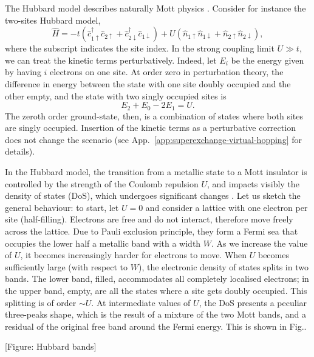 The Hubbard model describes naturally Mott physics \cite{scalapino2012common}. Consider for instance the two-sites Hubbard model,
\begin{equation}\label{eq:hubbard-2-sites}
	\hat H = 
	-t \left(
		\hat c_{1\uparrow}^\dagger \hat c_{2\uparrow} + \hat c_{2\downarrow}^\dagger \hat c_{1\downarrow}
	\right)
	+ U \left(
		\hat n_{1\uparrow} \hat n_{1\downarrow} + \hat n_{2\uparrow} \hat n_{2\downarrow} 
	\right),
\end{equation}
where the subscript indicates the site index. In the strong coupling limit $U \gg t$, we can treat the kinetic terms perturbatively. Indeed, let $E_i$ be the energy given by having $i$ electrons on one site. At order zero in perturbation theory, the difference in energy between the state with one site doubly occupied and the other empty, and the state with two singly occupied sites is
\[
	E_2 + E_0 - 2E_1 = U.
\]
The zeroth order ground-state, then, is a combination of states where both sites are singly occupied. Insertion of the kinetic terms as a perturbative correction does not change the scenario (see App.~\ref{app:superexchange-virtual-hopping} for details).

In the Hubbard model, the transition from a metallic state to a Mott insulator is controlled by the strength of the Coulomb repulsion $U$, and impacts visibly the density of states (DoS), which undergoes significant changes \cite{kotliar2004strongly}. Let us sketch the general behaviour: to start, let $U=0$ and consider a lattice with one electron per site (half-filling). Electrons are free and do not interact, therefore move freely across the lattice. Due to Pauli exclusion principle, they form a Fermi sea that occupies the lower half a metallic band with a width $W$. As we increase the value of $U$, it becomes increasingly harder for electrons to move. When $U$ becomes sufficiently large (with respect to $W$), the electronic density of states splits in two bands. The lower band, filled, accommodates all completely localised electrons; in the upper band, empty, are all the states where a site gets doubly occupied. This splitting is of order $\sim U$. At intermediate values of $U$, the DoS presents a peculiar three-peaks shape, which is the result of a mixture of the two Mott bands, and a residual of the original free band around the Fermi energy. This is shown in Fig.\mref. 

\begin{center}
	[Figure: Hubbard bands]
\end{center}

